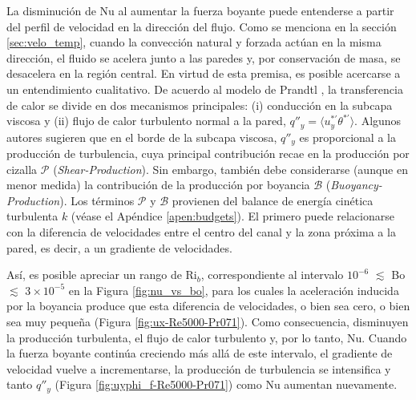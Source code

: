 La disminución de Nu al aumentar la fuerza boyante puede entenderse a partir del perfil de velocidad en la dirección del flujo. Como se menciona en la sección \ref{sec:velo_temp}, cuando la convección natural y forzada actúan en la misma dirección, el fluido se acelera junto a las paredes y, por conservación de masa, se desacelera en la región central. En virtud de esta premisa, es posible acercarse a un entendimiento cualitativo. De acuerdo al modelo de Prandtl \cite{Prandtl1942}, la transferencia de calor se divide en dos mecanismos principales: (i) conducción en la subcapa viscosa y (ii) flujo de calor turbulento normal a la pared, $q''_y = \langle u^{* \prime}_y \theta^{* \prime} \rangle$. Algunos autores \cite{aicher1997, hall1969laminarization} sugieren que en el borde de la subcapa viscosa,  $q''_y$ es proporcional a la producción de turbulencia, cuya principal contribución recae en la producción por cizalla $\mathcal{P}$ (\textit{Shear-Production}). Sin embargo, también debe considerarse (aunque en menor medida) la contribución de la producción por boyancia $\mathcal{B}$ (\textit{Buoyancy-Production}). Los términos $\mathcal{P}$ y $\mathcal{B}$ provienen del balance de energía cinética turbulenta $k$  (véase el Apéndice \ref{apen:budgets}). El primero puede relacionarse con la diferencia de velocidades entre el centro del canal y la zona próxima a la pared, es decir, a un gradiente de velocidades.

Así, es posible apreciar un rango de Ri$_b$, correspondiente al intervalo $10^{-6}$ $\lesssim$ Bo $\lesssim$ $3 \times 10^{-5}$ en la Figura \ref{fig:nu_vs_bo}, para los cuales la aceleración inducida por la boyancia produce que esta diferencia de velocidades, o bien sea cero, o bien sea muy pequeña (Figura \ref{fig:ux-Re5000-Pr071}). Como consecuencia, disminuyen la producción turbulenta, el flujo de calor turbulento y, por lo tanto, Nu. Cuando la fuerza boyante continúa creciendo más allá de este intervalo, el gradiente de velocidad vuelve a incrementarse, la producción de turbulencia se intensifica y tanto $q''_y$ (Figura \ref{fig:uyphi_f-Re5000-Pr071}) como Nu aumentan nuevamente. 

